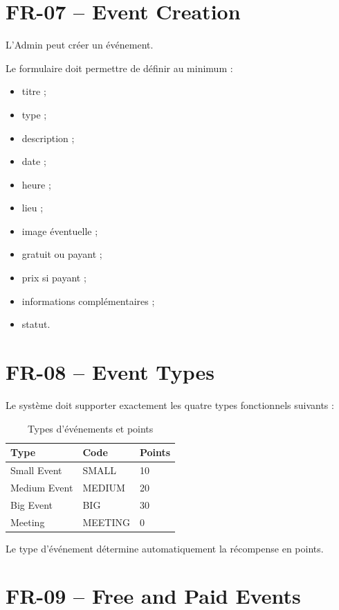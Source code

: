 \documentclass[11pt,a4paper]{report}
\begin{document}
\section{FR-07 -- Event Creation}

L'Admin peut créer un événement.

Le formulaire doit permettre de définir au minimum :

\begin{itemize}
    \item titre ;
    \item type ;
    \item description ;
    \item date ;
    \item heure ;
    \item lieu ;
    \item image éventuelle ;
    \item gratuit ou payant ;
    \item prix si payant ;
    \item informations complémentaires ;
    \item statut.
\end{itemize}

\section{FR-08 -- Event Types}

Le système doit supporter exactement les quatre types fonctionnels suivants :

\begin{table}[H]
\centering
\caption{Types d'événements et points}
\begin{tabular}{lll}
\toprule
\textbf{Type} & \textbf{Code} & \textbf{Points}\\
\midrule
Small Event & SMALL & 10\\
Medium Event & MEDIUM & 20\\
Big Event & BIG & 30\\
Meeting & MEETING & 0\\
\bottomrule
\end{tabular}
\end{table}

Le type d'événement détermine automatiquement la récompense en points.

\section{FR-09 -- Free and Paid Events}
\end{document}

